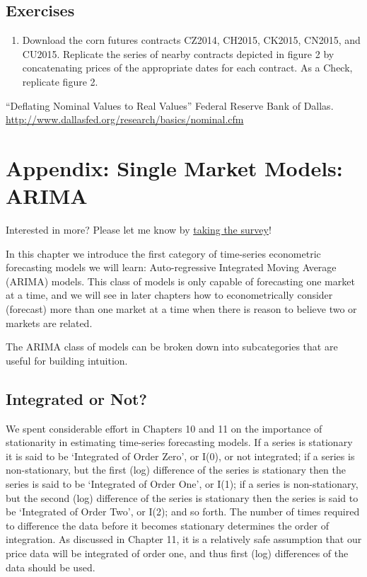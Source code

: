 \documentclass[
  letterpaper,
  DIV=11,
  numbers=noendperiod]{scrreprt}
\providecommand{\tightlist}{%
  \setlength{\itemsep}{0pt}\setlength{\parskip}{0pt}}\usepackage{longtable,booktabs,array}
\begin{document}
\section{Exercises}\label{exercises-10}

\begin{enumerate}
\def\labelenumi{\arabic{enumi}.}
\tightlist
\item
  Download the corn futures contracts CZ2014, CH2015, CK2015, CN2015,
  and CU2015. Replicate the series of nearby contracts depicted in
  figure 2 by concatenating prices of the appropriate dates for each
  contract. As a Check, replicate figure 2.
\end{enumerate}

``Deflating Nominal Values to Real Values'' Federal Reserve Bank of
Dallas. \url{http://www.dallasfed.org/research/basics/nominal.cfm}


\chapter{Appendix: Single Market Models:
ARIMA}\label{appendix-single-market-models-arima}

{Interested in more? Please let me know by}
\href{https://forms.gle/Q3VByCQZHjfQSy9D7}{taking the survey}!

In this chapter we introduce the first category of time-series
econometric forecasting models we will learn: Auto-regressive Integrated
Moving Average (ARIMA) models. This class of models is only capable of
forecasting one market at a time, and we will see in later chapters how
to econometrically consider (forecast) more than one market at a time
when there is reason to believe two or markets are related.

The ARIMA class of models can be broken down into subcategories that are
useful for building intuition.

\section{Integrated or Not?}\label{integrated-or-not}

We spent considerable effort in Chapters 10 and 11 on the importance of
stationarity in estimating time-series forecasting models. If a series
is stationary it is said to be `Integrated of Order Zero', or I(0), or
not integrated; if a series is non-stationary, but the first (log)
difference of the series is stationary then the series is said to be
`Integrated of Order One', or I(1); if a series is non-stationary, but
the second (log) difference of the series is stationary then the series
is said to be `Integrated of Order Two', or I(2); and so forth. The
number of times required to difference the data before it becomes
stationary determines the order of integration. As discussed in Chapter
11, it is a relatively safe assumption that our price data will be
integrated of order one, and thus first (log) differences of the data
should be used.
\end{document}
